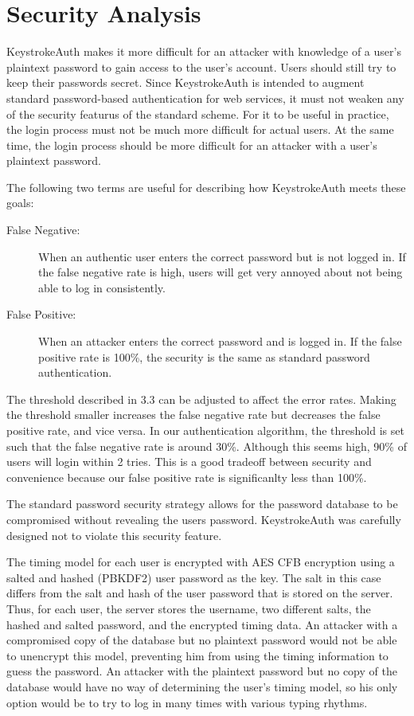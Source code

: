 \documentclass{article}
\begin{document}
\section{Security Analysis}
KeystrokeAuth makes it more difficult for an attacker with knowledge of a user's plaintext password to gain access to the user's account.
Users should still try to keep their passwords secret.
Since KeystrokeAuth is intended to augment standard password-based authentication for web services, it must not weaken any of the security featurus of the standard scheme. 
For it to be useful in practice, the login process must not be much more difficult for actual users.
At the same time, the login process should be more difficult for an attacker with a user's plaintext password.

The following two terms are useful for describing how KeystrokeAuth meets these goals:

\begin{description}
  \item[False Negative:] When an authentic user enters the correct password but is not logged in. If the false negative rate is high, users will get very annoyed about not being able to log in consistently.
  \item[False Positive:] When an attacker enters the correct password and is logged in. If the false positive rate is 100\%, the security is the same as standard password authentication.
\end{description}

The threshold described in 3.3 can be adjusted to affect the error rates. 
Making the threshold smaller increases the false negative rate but decreases the false positive rate, and vice versa.
In our authentication algorithm, the threshold is set such that the false negative rate is around 30\%. Although this seems high, 90\% of users will login within 2 tries. This is a good tradeoff between security and convenience because our false positive rate is significanlty less than 100\%.

The standard password security strategy allows for the password database to be compromised without revealing the users password.
KeystrokeAuth was carefully designed not to violate this security feature.

The timing model for each user is encrypted with AES CFB encryption using a salted and hashed (PBKDF2) user password as the key. The salt in this case differs from the salt and hash of the user password that is stored on the server. Thus, for each user, the server stores the username, two different salts, the hashed and salted password, and the encrypted timing data. 
An attacker with a compromised copy of the database but no plaintext password would not be able to unencrypt this model, preventing him from using the timing information to guess the password.
An attacker with the plaintext password but no copy of the database would have no way of determining the user's timing model, so his only option would be to try to log in many times with various typing rhythms. 
\end{document}
